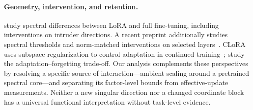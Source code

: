\paragraph{Geometry, intervention, and retention.}
\citet{shuttleworth2025illusion} study spectral differences between LoRA and full fine-tuning, including interventions on intruder directions. A recent preprint additionally studies spectral thresholds and norm-matched interventions on selected layers~\citep{xie2026intruder}. CLoRA uses subspace regularization to control adaptation in continued training~\citep{lu2025controlled}; \citet{biderman2024lora} study the adaptation--forgetting trade-off. Our analysis complements these perspectives by resolving a specific source of interaction---ambient scaling around a pretrained spectral core---and separating its factor-level bounds from effective-update measurements. Neither a new singular direction nor a changed coordinate block has a universal functional interpretation without task-level evidence.
